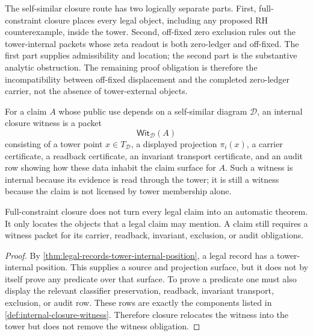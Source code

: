 \begin{principle}
\label{prin:closure-plus-exclusion-rh-route}
The self-similar closure route has two logically separate parts. First,
full-constraint closure places every legal object, including any proposed
RH counterexample, inside the tower. Second, off-fixed zero exclusion
rules out the tower-internal packets whose zeta readout is both
zero-ledger and off-fixed. The first part supplies admissibility and
location; the second part is the substantive analytic obstruction. The
remaining proof obligation is therefore the incompatibility between
off-fixed displacement and the completed zero-ledger carrier, not the
absence of tower-external objects.
\end{principle}

\begin{definition}
\label{def:internal-closure-witness}
For a claim $A$ whose public use depends on a self-similar diagram
$\mathcal D$, an internal closure witness is a packet
$$
\mathsf{Wit}_{\mathcal D}(A)
$$
consisting of a tower point $x\in T_{\mathcal D}$, a displayed projection
$\pi_i(x)$, a carrier certificate, a readback certificate, an invariant
transport certificate, and an audit row showing how these data inhabit the
claim surface for $A$. Such a witness is internal because its evidence is
read through the tower; it is still a witness because the claim is not
licensed by tower membership alone.
\end{definition}

\begin{theorem}
\label{thm:closure-does-not-cancel-witnesses}
Full-constraint closure does not turn every legal claim into an automatic
theorem. It only locates the objects that a legal claim may mention. A
claim still requires a witness packet for its carrier, readback,
invariant, exclusion, or audit obligations.
\end{theorem}

\begin{proof}
By \autoref{thm:legal-records-tower-internal-position}, a legal record has
a tower-internal position. This supplies a source and projection surface,
but it does not by itself prove any predicate over that surface. To prove
a predicate one must also display the relevant classifier preservation,
readback, invariant transport, exclusion, or audit row. These rows are
exactly the components listed in
\autoref{def:internal-closure-witness}. Therefore closure relocates the
witness into the tower but does not remove the witness obligation.
\end{proof}

